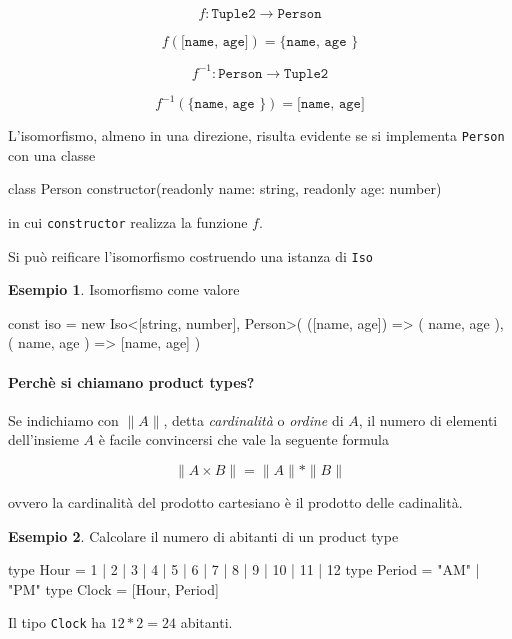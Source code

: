 \documentclass[12pt]{article}
\theoremstyle{definition}
\newtheorem{example}{Esempio}[subsection]
\newenvironment{code}
  {\vspace{0.5cm} \VerbatimEnvironment\begin{typescriptcode}}
  {\end{typescriptcode} \vspace{0.2cm}}
\begin{document}
$$
f: \texttt{Tuple2} \rightarrow \texttt{Person}
$$

$$
f(\texttt{[name, age]}) = \texttt{\{ name, age  \}}
$$

$$
f^{-1}: \texttt{Person} \rightarrow \texttt{Tuple2}
$$

$$
f^{-1}(\texttt{\{ name, age  \}}) = \texttt{[name, age]}
$$

L'isomorfismo, almeno in una direzione, risulta evidente se si implementa \texttt{Person} con una classe

\begin{code}
class Person {
  constructor(readonly name: string, readonly age: number) {}
}
\end{code}

in cui \texttt{constructor} realizza la funzione $f$.

Si può reificare l'isomorfismo costruendo una istanza di \texttt{Iso}

\begin{example}
Isomorfismo come valore

\begin{code}
const iso = new Iso<[string, number], Person>(
  ([name, age]) => ({ name, age }),
  ({ name, age }) => [name, age]
)
\end{code}
\end{example}

\paragraph{Perchè si chiamano product types?}

Se indichiamo con $\|A\|$, detta \emph{cardinalità} o \emph{ordine} di $A$, il numero di elementi
dell'insieme $A$ è facile convincersi che vale la seguente formula

$$
\|A \times B\| = \|A\| * \|B\|
$$

ovvero la cardinalità del prodotto cartesiano è il prodotto delle cadinalità.

\begin{example}
Calcolare il numero di abitanti di un product type

\begin{code}
type Hour = 1 | 2 | 3 | 4 | 5 | 6 | 7 | 8 | 9 | 10 | 11 | 12
type Period = "AM" | "PM"
type Clock = [Hour, Period]
\end{code}

Il tipo \texttt{Clock} ha $12 * 2 = 24$ abitanti.
\end{example}
\end{document}
